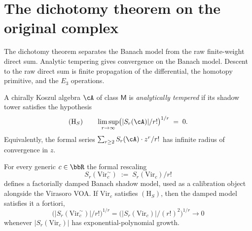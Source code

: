 \section{The dichotomy theorem on the original complex}
\label{sec:original-complex-dichotomy}

The dichotomy theorem separates the Banach model from the raw
finite-weight direct sum. Analytic tempering gives convergence on the
Banach model. Descent to the raw direct sum is finite propagation of
the differential, the homotopy primitive, and the $E_3$ operations.

\begin{definition}
\label{def:analytically-tempered-class-m}
A chirally Koszul algebra $\cA$ of class $\mathsf{M}$ is
\emph{analytically tempered} if its shadow tower satisfies the
hypothesis
\[
 (\mathrm{H}_S) \qquad
 \limsup_{r \to \infty}
 \bigl( \lvert S_r(\cA) \rvert / r! \bigr)^{1/r}
 \;=\; 0.
\]
Equivalently, the formal series
$\sum_{r \ge 2} S_r(\cA) \cdot z^r / r!$ has infinite radius of
convergence in $z$.
\end{definition}

\begin{example}
\label{ex:tempered-virasoro}
For every generic $c \in \bbR$ the formal rescaling
\[
 S_r(\mathrm{Vir}_c^{\sim})
 \;:=\;
 S_r(\mathrm{Vir}_c)/r!
\]
defines a factorially damped Banach shadow model, used as a
calibration object alongside the Virasoro VOA. If $\mathrm{Vir}_c$
satisfies $(\mathrm{H}_S)$, then the damped model satisfies it a
fortiori,
\[
 \bigl(\lvert S_r(\mathrm{Vir}_c^{\sim})\rvert/r!\bigr)^{1/r}
 =
 \bigl(\lvert S_r(\mathrm{Vir}_c)\rvert/(r!)^2\bigr)^{1/r}
 \longrightarrow 0
\]
whenever $\lvert S_r(\mathrm{Vir}_c)\rvert$ has
exponential-polynomial growth.
\end{example}

